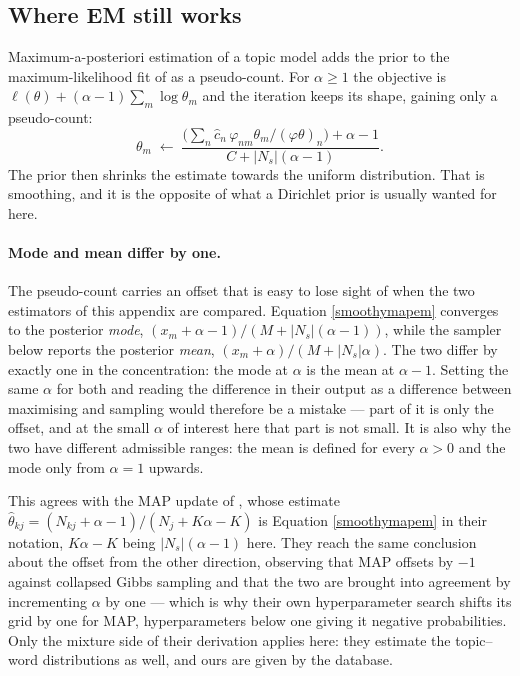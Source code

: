 \documentclass[pdflatex,sn-vancouver-num]{sn-jnl}
\begin{document}
\begin{appendices}
    \subsection{Where EM still works}\label{mapworks}
    Maximum-a-posteriori estimation of a topic model
    \citep{defreitas2001bayesian,chien2008adaptive} adds the prior to the maximum-likelihood fit of
    \citet{hofmann1999plsa} as a pseudo-count. For $\alpha \geq 1$ the objective is
    $\ell(\theta) + (\alpha - 1) \sum_m \log \theta_m$ and the iteration keeps its shape, gaining
    only a pseudo-count:
    \begin{equation}\label{smoothymapem}
        \theta_m \;\longleftarrow\; \frac{\bigl( \sum_n \hat{c}_n \, \varphi_{nm} \theta_m /
            (\varphi\theta)_n \bigr) + \alpha - 1}{C + \lvert N_s \rvert (\alpha - 1)} .
    \end{equation}
    The prior then shrinks the estimate towards the uniform distribution. That is smoothing, and it is
    the opposite of what a Dirichlet prior is usually wanted for here.

    \paragraph{Mode and mean differ by one.} The pseudo-count carries an offset that is easy to lose
    sight of when the two estimators of this appendix are compared. Equation \eqref{smoothymapem}
    converges to the posterior \emph{mode},
    $(x_m + \alpha - 1) / (M + \lvert N_s \rvert (\alpha - 1))$, while the sampler below reports the
    posterior \emph{mean}, $(x_m + \alpha) / (M + \lvert N_s \rvert \alpha)$. The two differ by exactly
    one in the concentration: the mode at $\alpha$ is the mean at $\alpha - 1$. Setting the same
    $\alpha$ for both and reading the difference in their output as a difference between maximising
    and sampling would therefore be a mistake --- part of it is only the offset, and at the small
    $\alpha$ of interest here that part is not small. It is also why the two have different admissible
    ranges: the mean is defined for every $\alpha > 0$ and the mode only from $\alpha = 1$ upwards.

    This agrees with the MAP update of \citet{asuncion2009smoothing}, whose estimate
    $\hat{\theta}_{kj} = (N_{kj} + \alpha - 1)/(N_j + K\alpha - K)$ is
    Equation \eqref{smoothymapem} in their notation, $K\alpha - K$ being $\lvert N_s \rvert (\alpha -
    1)$ here. They reach the same conclusion about the offset from the other direction, observing that
    MAP offsets by $-1$ against collapsed Gibbs sampling and that the two are brought into agreement
    by incrementing $\alpha$ by one --- which is why their own hyperparameter search shifts its grid
    by one for MAP, hyperparameters below one giving it negative probabilities. Only the mixture side
    of their derivation applies here: they estimate the topic--word distributions as well, and ours
    are given by the database.


\end{appendices}
\end{document}
